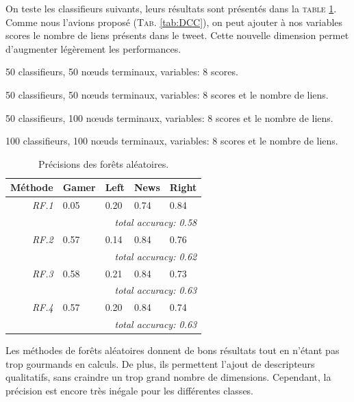 \documentclass[twocolumn,10pt]{article}
\begin{document}
On teste les classifieurs suivants, leurs résultats sont présentés dans la \textsc{table} \ref{tab:PFA}. Comme nous l'avions proposé (\textsc{Tab.} \ref{tab:DCC}), on peut ajouter à nos variables scores le nombre de liens présents dans le tweet. Cette nouvelle dimension permet d'augmenter légèrement les performances.

\begin{enumerate}[label={[\textit{RF.\theenumi}]}]
\item 50 classifieurs, 50 nœuds terminaux, variables: 8 scores.
\item 50 classifieurs, 50 nœuds terminaux, variables: 8 scores et le nombre de liens.
\item 50 classifieurs, 100 nœuds terminaux, variables: 8 scores et le nombre de liens.
\item 100 classifieurs, 100 nœuds terminaux, variables: 8 scores et le nombre de liens.
\end{enumerate}

\begin{table}[h]
\begin{center}
\noindent\begin{tabular}{r|llll}
Méthode & Gamer & Left & News & Right \\ 
\hline 
\textit{RF.1} & 0.05 & 0.20 & 0.74 & 0.84 \\
 & \multicolumn{4}{|r}{\textit{total accuracy: 0.58}} \\
\textit{RF.2} & 0.57 & 0.14 & 0.84 & 0.76 \\
 & \multicolumn{4}{|r}{\textit{total accuracy: 0.62}} \\
\textit{RF.3} & 0.58 & 0.21 & 0.84 & 0.73 \\
 & \multicolumn{4}{|r}{\textit{total accuracy: 0.63}} \\
\textit{RF.4} & 0.57 & 0.20 & 0.84 & 0.74 \\
 & \multicolumn{4}{|r}{\textit{total accuracy: 0.63}} \\
\end{tabular}
\caption{\label{tab:PFA} Précisions des forêts aléatoires.}
\end{center} 
\end{table}

Les méthodes de forêts aléatoires donnent de bons résultats tout en n'étant pas trop gourmands en calculs. De plus, ils permettent l'ajout de descripteurs qualitatifs, sans craindre un trop grand nombre de dimensions. Cependant, la précision est encore très inégale pour les différentes classes.
\end{document}
